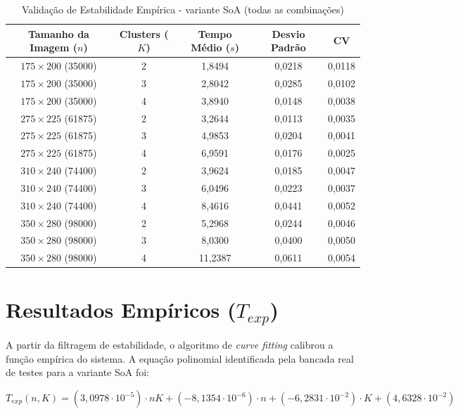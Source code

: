 \documentclass[11pt,a4paper]{article}
\begin{document}
\begin{table}[h!]
\centering
\caption{Validação de Estabilidade Empírica - variante SoA (todas as combinações)}
\label{tab:estabilidade}
\begin{tabular}{@{}ccccc@{}}
\toprule
\textbf{Tamanho da Imagem ($n$)} & \textbf{Clusters ($K$)} & \textbf{Tempo Médio ($s$)} & \textbf{Desvio Padrão} & \textbf{CV} \\ \midrule
$175 \times 200$ (35000) & 2 & 1,8494 & 0,0218 & 0,0118 \\
$175 \times 200$ (35000) & 3 & 2,8042 & 0,0285 & 0,0102 \\
$175 \times 200$ (35000) & 4 & 3,8940 & 0,0148 & 0,0038 \\ \midrule
$275 \times 225$ (61875) & 2 & 3,2644 & 0,0113 & 0,0035 \\
$275 \times 225$ (61875) & 3 & 4,9853 & 0,0204 & 0,0041 \\
$275 \times 225$ (61875) & 4 & 6,9591 & 0,0176 & 0,0025 \\ \midrule
$310 \times 240$ (74400) & 2 & 3,9624 & 0,0185 & 0,0047 \\
$310 \times 240$ (74400) & 3 & 6,0496 & 0,0223 & 0,0037 \\
$310 \times 240$ (74400) & 4 & 8,4616 & 0,0441 & 0,0052 \\ \midrule
$350 \times 280$ (98000) & 2 & 5,2968 & 0,0244 & 0,0046 \\
$350 \times 280$ (98000) & 3 & 8,0300 & 0,0400 & 0,0050 \\
$350 \times 280$ (98000) & 4 & 11,2387 & 0,0611 & 0,0054 \\ \bottomrule
\end{tabular}
\end{table}

\section{Resultados Empíricos ($T_{exp}$)}

A partir da filtragem de estabilidade, o algoritmo de \textit{curve fitting} calibrou a função empírica do sistema. A equação polinomial identificada pela bancada real de testes para a variante SoA foi:

\begin{equation}
    T_{exp}(n, K) = (3{,}0978 \cdot 10^{-5}) \cdot nK + (-8{,}1354 \cdot 10^{-6}) \cdot n + (-6{,}2831 \cdot 10^{-2}) \cdot K + (4{,}6328 \cdot 10^{-2})
\end{equation}
\end{document}
